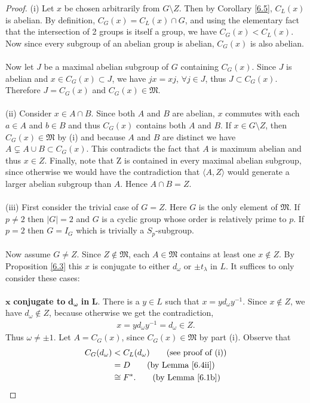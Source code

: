 \begin{proof} (i) Let $x$ be chosen arbitrarily from $G \! \setminus \! Z$. Then by Corollary \ref{6.5}, $C_L(x)$ is abelian. By definition, $C_G(x) = C_L(x) \cap G$, and using the elementary fact that the intersection of 2 groups is itself a group, we have $C_G(x) < C_L(x)$. Now since every subgroup of an abelian group is abelian, $C_G(x)$ is also abelian. \\
\\
Now let $J$ be a maximal abelian subgroup of $G$ containing $C_G(x)$. Since $J$ is abelian and $x \in C_G(x) \subset J$, we have $jx=xj$, $\forall j \in J$, thus $J \subset C_G(x)$. Therefore $J=C_G(x)$ and $C_G(x) \in \mathfrak{M}$. \\
\\
(ii) Consider $x \in A \cap B$. Since both $A$ and $B$ are abelian, $x$ commutes with each $a \in A$ and $b \in B$ and thus $C_G(x)$ contains both $A$ and $B$.  If $x \in G \setminus Z$, then $C_G(x) \in \mathfrak{M}$ by (i) and because $A$ and $B$ are distinct we have $A \subsetneq A \cup B \subset C_G(x)$. This contradicts the fact that $A$ is maximum abelian and thus $x \in Z$. Finally, note that Z is contained in every maximal abelian subgroup, since otherwise we would have the contradiction that $\langle A, Z \rangle$ would generate a larger abelian subgroup than $A$. Hence $A \cap B = Z$. \\
\\
(iii) First consider the trivial case of $G=Z$. Here $G$ is the only element of $\mathfrak{M}$. If $p \neq 2$ then $|G|=2$ and $G$ is a cyclic group whose order is relatively prime to $p$. If $p=2$ then $G = I_G$ which is trivially a $S_p$-subgroup. \\
\\
Now assume $G \neq Z$. Since $Z \not \in \mathfrak{M}$, each $A \in \mathfrak{M}$ contains at least one $x \not \in Z$. By Proposition  \ref{6.3} this $x$ is conjugate to either $d_\omega$ or $\pm t_\lambda$ in $L$. It suffices to only consider these cases: \\
\\
 \space $\pmb{x}$ \textbf{conjugate to} $\pmb{d_\omega}$ \textbf{in} $\pmb {L}$. There is a $y \in L$ such that $x = y d_\omega y^{-1}$. Since $x \not \in Z$, we have $d_\omega \not \in Z$, because otherwise we get the contradiction,
\begin{align*} x =  y d_\omega y^{-1} = d_\omega \in Z.
\end{align*}
Thus $\omega \neq \pm 1$. Let $A = C_G(x)$, since $C_G(x) \in \mathfrak{M}$ by part (i). Observe that
\begin{align*}  C_G(d_\omega) &<  C_L(d_\omega)  \tag{see proof of (i)}
\\ &= D  \tag{by Lemma \ref{6.4ii}}
\\ &\cong F^*.  \tag{by Lemma \ref{6.1b}}
\end{align*}


\end{proof}
